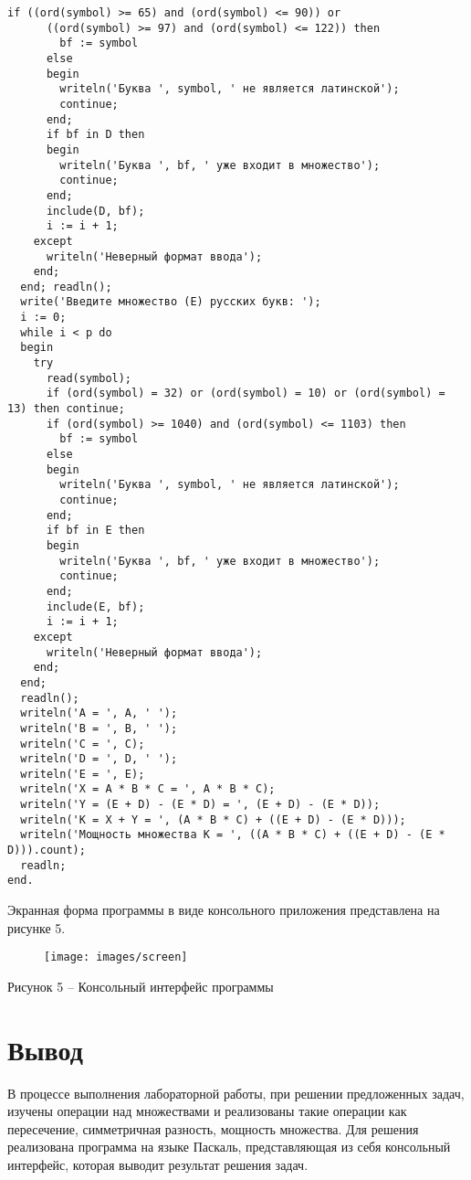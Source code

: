 \documentclass[a4paper,14pt]{extarticle}
\begin{document}
\begin{Verbatim}[tabsize=2]
      if ((ord(symbol) >= 65) and (ord(symbol) <= 90)) or 
      ((ord(symbol) >= 97) and (ord(symbol) <= 122)) then
        bf := symbol
      else
      begin
        writeln('Буква ', symbol, ' не является латинской');
        continue;
      end;
      if bf in D then
      begin
        writeln('Буква ', bf, ' уже входит в множество');
        continue;
      end;
      include(D, bf);
      i := i + 1;
    except
      writeln('Неверный формат ввода');
    end;
  end; readln();
  write('Введите множество (E) русских букв: ');
  i := 0;
  while i < p do
  begin
    try
      read(symbol);
      if (ord(symbol) = 32) or (ord(symbol) = 10) or (ord(symbol) = 13) then continue;
      if (ord(symbol) >= 1040) and (ord(symbol) <= 1103) then
        bf := symbol
      else
      begin
        writeln('Буква ', symbol, ' не является латинской');
        continue;
      end;
      if bf in E then
      begin
        writeln('Буква ', bf, ' уже входит в множество');
        continue;
      end;
      include(E, bf);
      i := i + 1;
    except
      writeln('Неверный формат ввода');
    end;
  end;
  readln();
  writeln('A = ', A, ' ');
  writeln('B = ', B, ' ');
  writeln('C = ', C);
  writeln('D = ', D, ' ');
  writeln('E = ', E);
  writeln('X = A * B * C = ', A * B * C);
  writeln('Y = (E + D) - (E * D) = ', (E + D) - (E * D));
  writeln('K = X + Y = ', (A * B * C) + ((E + D) - (E * D)));
  writeln('Мощность множества K = ', ((A * B * C) + ((E + D) - (E * D))).count);
  readln;
end.
  \end{Verbatim}

  Экранная форма программы в виде консольного приложения представлена на рисунке 5.
  \begin{figure}[h]
    \centering
    \texttt{[image: images/screen]}
  \end{figure}
  \begin{center}
    Рисунок 5 – Консольный интерфейс программы
  \end{center}

  \section*{Вывод}
  В процессе выполнения лабораторной работы, при решении предложенных задач, изучены операции над множествами и реализованы такие операции как пересечение, симметричная разность, мощность множества. Для решения реализована программа на языке Паскаль, представляющая из себя консольный интерфейс, которая выводит результат решения задач.
\end{document}
